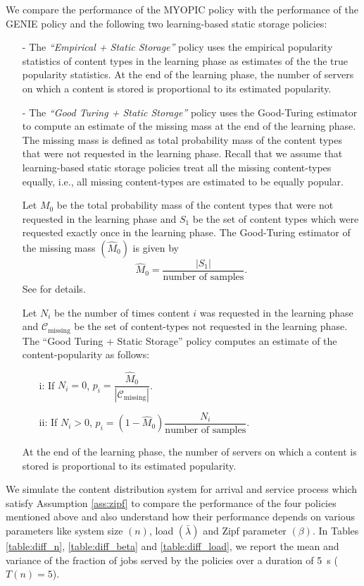 \documentclass[10pt, conference, letterpaper]{IEEEtran}
\begin{document}
We compare the performance of the MYOPIC policy with the performance of the GENIE policy and the following two learning-based static storage policies:
\begin{itemize}
	\item [-] The \emph{``Empirical + Static Storage''} policy uses the empirical popularity statistics of content types in the learning phase as estimates of the the true popularity statistics. At the end of the learning phase, the number of servers on which a content is stored is proportional to its estimated popularity.
	\item [-] The \emph{``Good Turing + Static Storage''} policy uses the
	Good-Turing estimator \cite{MS00} to compute an estimate of the
	missing mass at the end of the learning phase. The missing mass is
	defined as total probability mass of the content types that were not
	requested in the learning phase. Recall that we assume that learning-based static storage policies treat all the missing content-types equally, i.e., all missing content-types are estimated to be equally popular.
	
	Let $M_0$ be the total probability mass of the content types that were not requested in the learning
	phase and $S_1$ be the set of content types which were requested
	exactly once in the learning phase. The Good-Turing estimator of
	the missing mass $(\widehat{M}_0)$ is given by
	$$\widehat{M}_0 = \frac{|S_1|}{\text{number of samples}}.$$
	See \cite{MS00} for details.
	
	Let $N_i$ be the number of times content $i$ was requested in the
	learning phase and $\mathcal{C}_{\text{missing}}$ be the set of
	content-types not requested in the learning phase. The ``Good Turing + Static Storage'' policy computes an estimate of the content-popularity as follows:
	\begin{itemize}
		\item[i:] If $N_i = 0$, $p_i =  \dfrac{\widehat{M}_0}{|\mathcal{C}_{\text{missing}}|}$.
		\item[ii:] If $N_i > 0$, $p_i = (1-\widehat{M}_0) \dfrac{N_i}{\text{number of samples}}$.
	\end{itemize}
	At the end of the learning phase, the number of servers on which a content is stored is proportional to its estimated popularity.
\end{itemize}

We simulate the content distribution system for arrival and service process which satisfy Assumption \ref{ass:zipf} to compare the performance of the four policies mentioned above and also understand how their performance depends on various parameters like system size $(n)$, load $(\bar{\lambda})$ and Zipf parameter $(\beta)$. In Tables \ref{table:diff_n}, \ref{table:diff_beta} and \ref{table:diff_load}, we report the mean and variance of the fraction of jobs served by the policies over a duration of 5~s ($T(n) = 5$).
\end{document}
